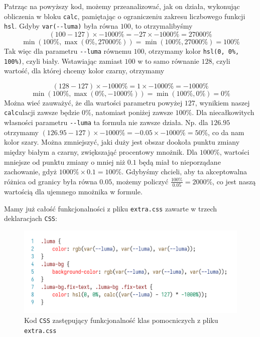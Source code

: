 \documentclass[licencjacka]{pracadypl}
\begin{document}
Patrząc na powyższy kod, możemy przeanalizować, jak on działa, wykonując obliczenia w bloku \texttt{calc}, pamiętając o ograniczeniu zakresu liczbowego funkcji \texttt{hsl}. Gdyby \texttt{var(-\.-luma)} była równa $100$, to otrzymalibyśmy
\[
  \left(100-127\right) \times -1000\% = -27 \times -1000\% = 27000\%
\]
\[
  \min\left(100\%, \max\left(0\%, 27000\%\right)\right) = \min\left(100\%, 27000\%\right) = 100\%
\]
Tak więc dla parametru \texttt{-\.-luma} równemu $100$, otrzymamy kolor \texttt{hsl(0, 0\%, 100\%)}, czyli biały. Wstawiając zamiast $100$ w to samo równanie $128$, czyli wartość, dla której chcemy kolor czarny, otrzymamy

\[
  \left(128-127\right) \times -1000\% = 1 \times -1000\% = -1000\%
\]
\[
  \min\left(100\%, \max\left(0\%, -1000\%\right)\right) = \min\left(100\%, 0\%\right) = 0\%
\]
Można wieć zauważyć, że dla wartości parametru powyżej $127$, wynikiem naszej \texttt{calc}ulacji zawsze będzie $0\%$, natomiast poniżej zawsze $100\%$. Dla niecałkowitych własności parametru \texttt{-\.-luma} ta formuła nie zawsze działa. Np. dla $126.95$ otrzymamy $\left(126.95-127\right)\times-1000\% = -0.05 \times -1000\% = 50\%$, co da nam kolor szary. Można zmniejszyć, jaki duży jest obszar dookoła punktu zmiany między białym a czarny, zwiększająć procentowy mnożnik. Dla $1000\%$, wartości mniejsze od punktu zmiany o mniej niż $0.1$ będą miał to nieporządane zachowanie, gdyż $1000\%\times0.1 = 100\%$. Gdybyśmy chcieli, aby ta akceptowalna różnica od granicy była równa $0.05$, możemy policzyć $\frac{100\%}{0.05} = 2000\%$, co jest naszą wartością dla ujemnego mnożnika w formule.

Mamy już całość funkcjonalności z pliku \texttt{extra.css} zawarte w trzech deklaracjach \texttt{CSS}:

\begin{figure}[H]
  \centering
  \includegraphics[width=\linewidth]{images/code-css-luma-all.png}
  \caption{Kod \texttt{CSS} zastępujący funkcjonalność klas pomocniczych z pliku \texttt{extra.css}}
  \label{fig:css-css-luma-all}
\end{figure}
\end{document}
